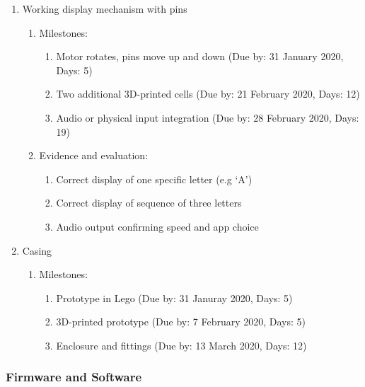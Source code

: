\documentclass{article}
\begin{document}
\begin{enumerate}
  \item Working display mechanism with pins
  \begin{enumerate}
    \item Milestones:
    \begin{enumerate}
      \item Motor rotates, pins move up and down (Due by: 31 January 2020, Days: 5)
      \item Two additional 3D-printed cells (Due by: 21 February 2020, Days: 12)
      \item Audio or physical input integration (Due by: 28 February 2020, Days: 19)
    \end{enumerate}
    \item Evidence and evaluation:
    \begin{enumerate}
      \item Correct display of one specific letter (e.g `A')
      \item Correct display of sequence of three letters
      \item Audio output confirming speed and app choice
    \end{enumerate}
  \end{enumerate}
  \item Casing
  \begin{enumerate}
    \item Milestones:
    \begin{enumerate}
      \item Prototype in Lego (Due by: 31 Januray 2020, Days: 5)
      \item 3D-printed prototype (Due by: 7 February 2020, Days: 5)
      \item Enclosure and fittings (Due by: 13 March 2020, Days: 12)
    \end{enumerate}
  \end{enumerate}
\end{enumerate}

\subsubsection{Firmware and Software}
\end{document}
